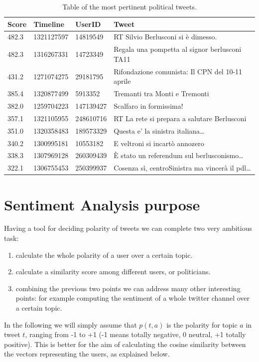 \documentclass[a4paper,11pt,oneside]{article}
\begin{document}
\begin{table}[h]
\centering
    \begin{tabular}{| l | l | l | p{8cm} |} %
    \hline
Score & Timeline & UserID & Tweet \\ \hline
482.3 & 1321127597 & 14819549 & \small{RT  Silvio Berlusconi si è dimesso.}\\
482.3 & 1316267331 & 14723349 & \small{Regala una pompetta al signor berlusconi TA11}\\
431.2 & 1271074275 & 29181795 & \small{Rifondazione comunista: Il CPN del 10-11 aprile}\\
385.4 & 1320877499 & 5913352 & \small{Tremanti tra Monti e Tremonti}\\
382.0 & 1259704223 & 147139427 & \small{Scalfaro in formissima!}\\
357.1 & 1321105955 & 248610716 &  \small{RT  La rete si prepara a salutare Berlusconi}\\
351.0 & 1320358483 & 189573329 & \small{Questa e' la sinistra italiana\dots}\\
340.2 & 1300995181 & 10553182 & \small{E veltroni si incartò annozero}\\
338.3 & 1307969128 & 260309439 & \small{È stato un referendum sul berlusconismo\dots}\\
322.1 & 1306755453 & 250399937 & \small{Cosenza sì, centroSinistra ma vincerà il pdl\dots}\\
 \hline
    \end{tabular}
    \caption{Table of the most pertinent political tweets.}
    \label{tab:pertinence}
\end{table}





\section{Sentiment Analysis purpose}
\label{sec:exitpoll}
Having a tool for deciding polarity of tweets we can complete two very ambitious task: 
\begin{enumerate}
\item calculate the whole polarity of a user over a certain topic.
\item calculate a similarity score among different users, or politicians.
\item combining the previous two points we can address many other interesting points: for example computing the sentiment of a whole twitter channel over a certain topic.
\end{enumerate}
In the following we will simply assume that $p(t,a)$ is the polarity for topic $a$ in tweet $t$, ranging from -1 to +1 (-1 means totally negative, 0 neutral, +1 totally positive). This is better for the aim of calculating the cosine similarity between the vectors representing the users, as explained below.
\end{document}

